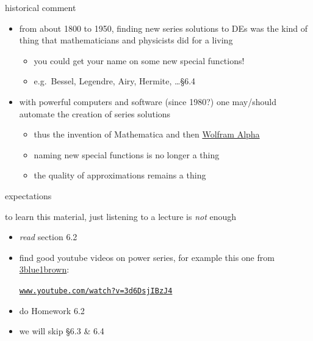 \documentclass[dvipsnames,colorlinks]{beamer}
\begin{document}
\begin{frame}{historical comment}

\begin{itemize}
\item from about 1800 to 1950, finding new series solutions to DEs was the kind of thing that mathematicians and physicists did for a living
    \begin{itemize}
    \item you could get your name on some new special functions!
    \item e.g.~Bessel, Legendre, Airy, Hermite, \dots \S 6.4
    \end{itemize}
\item with powerful computers and software (since 1980?) one may/should automate the creation of series solutions
    \begin{itemize}
    \item thus the invention of Mathematica and then \href{https://www.wolframalpha.com/}{Wolfram Alpha}
    \item naming new special functions is no longer a thing
    \item the quality of approximations remains a thing
    \end{itemize}
\end{itemize}
\end{frame}


\begin{frame}{expectations}

to learn this material, just listening to a lecture is \emph{not} enough
     \begin{itemize}
     \item \emph{read} section 6.2
     \item find good youtube videos on power series, for example this one from \href{https://www.youtube.com/@3blue1brown}{3blue1brown}:

\centerline{\href{https://www.youtube.com/watch?v=3d6DsjIBzJ4}{\texttt{www.youtube.com/watch?v=3d6DsjIBzJ4}}}

     \item do Homework 6.2
     \item we will skip \S 6.3 \& 6.4
     \end{itemize}
\end{frame}
\end{document}
